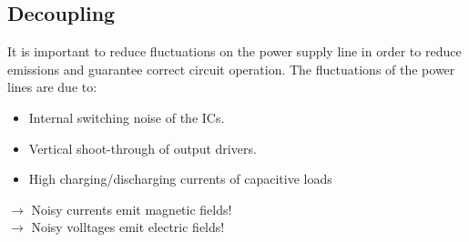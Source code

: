 	\subsection{Decoupling}
		It is important to reduce fluctuations on the power supply line in order to reduce emissions and guarantee correct circuit operation. The fluctuations of the power lines are due to: 
		\begin{itemize}
			\item Internal switching noise of the ICs.
			\item Vertical shoot-through of output drivers. 
			\item High charging/discharging currents of capacitive loads 
		\end{itemize}	
		$\rightarrow$ Noisy currents emit magnetic fields!\\
		$\rightarrow$ Noisy volltages emit electric fields!	
		
